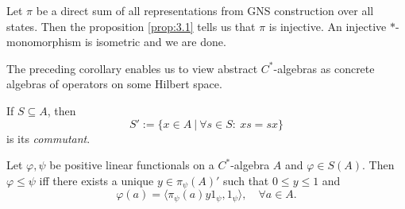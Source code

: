 \begin{myproof}
  Let $\pi$ be a direct sum of all representations from GNS construction over all states. Then the proposition \ref{prop:3.1} tells us that $\pi$ is injective. 
  An injective $*$-monomorphism is isometric and we are done.
\end{myproof}

The preceding corollary enables us to view abstract $C^*$-algebras as concrete algebras of operators on some Hilbert space.

\begin{definition}
  If $S \subseteq A$, then $$S' := \{x \in A\ |\ \forall s \in S:\ xs = sx\}$$
  is its \emph{commutant}.
\end{definition}

\begin{proposition}
  Let $\varphi, \psi$ be positive linear functionals on a $C^*$-algebra $A$ and $\varphi \in S(A)$.
  Then $\varphi \leq \psi$ iff there exists a unique $y \in \pi_{\psi} (A)'$ such that $0 \leq y \leq 1$
  and $$\varphi(a) = \langle \pi_{\psi} (a) y 1_{\psi}, 1_{\psi} \rangle,\quad \forall a \in A.$$
\end{proposition}

